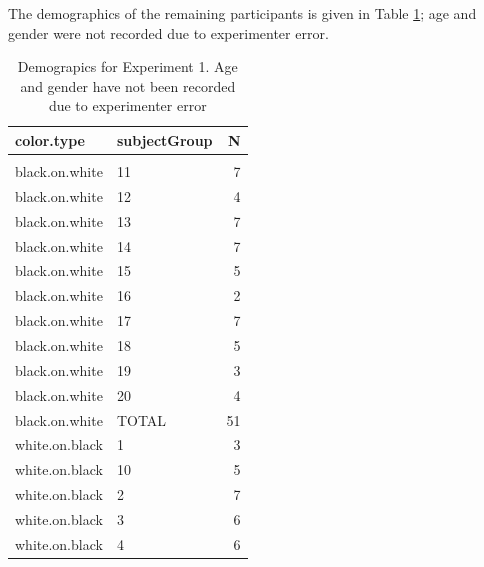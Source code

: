 \documentclass[
]{article}
\begin{document}
The demographics of the remaining participants is given in Table
\ref{tab:vsl-simultaneous-fa-demographics}; age and gender were not
recorded due to experimenter error.

\begin{table}

\caption{\label{tab:vsl-simultaneous-fa-demographics}Demograpics for Experiment 1. Age and gender have not been recorded due to experimenter error}
\centering
\begin{tabular}[t]{llr}
\toprule
color.type & subjectGroup & N\\
\midrule
\addlinespace[0.3em]
\multicolumn{3}{l}{\textbf{testable}}\\
\hspace{1em}black.on.white & 11 & 7\\
\hspace{1em}black.on.white & 12 & 4\\
\hspace{1em}black.on.white & 13 & 7\\
\hspace{1em}black.on.white & 14 & 7\\
\hspace{1em}black.on.white & 15 & 5\\
\hspace{1em}black.on.white & 16 & \vphantom{1} 2\\
\hspace{1em}black.on.white & 17 & 7\\
\hspace{1em}black.on.white & 18 & 5\\
\hspace{1em}black.on.white & 19 & 3\\
\hspace{1em}black.on.white & 20 & 4\\
\hspace{1em}black.on.white & TOTAL & 51\\
\hspace{1em}white.on.black & 1 & 3\\
\hspace{1em}white.on.black & 10 & 5\\
\hspace{1em}white.on.black & 2 & 7\\
\hspace{1em}white.on.black & 3 & 6\\
\hspace{1em}white.on.black & 4 & 6\\

\end{tabular}
\end{table}
\end{document}
